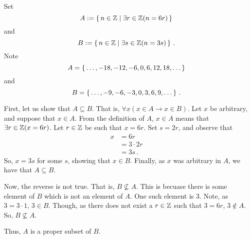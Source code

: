\guard



\begin{exmp}
\label{exmp:earlySubsetExample}
  Set \[ A := \left\{\, n\in\mathbb{Z} \mid \exists r\in\mathbb{Z}( n = 6r )\,\right\} \] and \[ B := \left\{\, n\in\mathbb{Z}\mid \exists s\in\mathbb{Z}( n=3s )\,\right\}\,. \]
  Note \[ A = \left\{\, \dots, -18,-12,-6,0,6,12,18,\dots\,\right\} \] and \[ B = \left\{\, \dots,-9,-6,-3,0,3,6,9,\dots \,\right\}\,.\]

  First, let us show that $A\subseteq B$.
  That is, $\forall x( x\in A \rightarrow x\in B)$.
  Let $x$ be arbitrary, and suppose that $x\in A$.
  From the definition of $A$, $x\in A$ means that $\exists r\in\mathbb{Z}( x= 6r)$.
  Let $r\in\mathbb{Z}$ be such that $x=6r$.
  Set $s=2r$, and observe that
  \begin{align*}
    x &= 6r \\
      &= 3\cdot2 r\\
      &= 3s\,.
  \end{align*}
  So, $x=3s$ for some $s$, showing that $x\in B$.
  Finally, as $x$ was arbitrary in $A$, we have that $A\subseteq B$.


  Now, the reverse is not true.
  That is, $B\not\subseteq A$.
  This is becuase there is some element of $B$ which is not an element of $A$.
  One such element is $3$.
  Note, as $3=3\cdot 1$, $3\in B$.
  Though, as there does not exist a $r\in\mathbb{Z}$ such that $3=6r$, $3\not\in A$.
  So, $B\not\subseteq A$.

  Thus, $A$ is a proper subset of $B$. 
\end{exmp}
